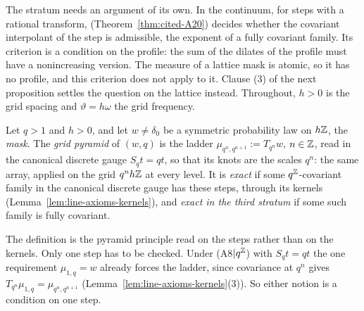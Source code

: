 The stratum needs an argument of its own. In the continuum, for steps with a rational transform,
 (Theorem~\ref{thm:cited-A20}) decides whether the covariant
interpolant of the step is admissible, the exponent of a fully covariant family. Its criterion is a
condition on the \Levy{} profile: the sum of the dilates of the profile must have a nonincreasing
version. The \Levy{} measure of a lattice mask is atomic, so it has no profile, and this criterion
does not apply to it. Clause (3) of the next proposition settles the question on the lattice
instead. Throughout, $h > 0$ is the grid spacing and $\vartheta = h\omega$ the grid frequency.

\begin{definition}
\label{def:grid-pyramid-line}

Let $q > 1$ and $h > 0$, and let $w \ne \delta_0$ be a symmetric probability law on $h\mathbb{Z}$, the
\emph{mask}. The \emph{grid pyramid} of $(w, q)$ is the ladder $\mu_{q^n,q^{n+1}} := T_{q^n}w$,
$n \in \mathbb{Z}$, read in the canonical discrete gauge $S_qt = qt$, so that its knots are the scales
$q^n$: the same array, applied on the grid $q^nh\mathbb{Z}$ at every level. It is
\emph{exact} if some $q^{\mathbb{Z}}$-covariant family in the canonical discrete gauge has these
steps, through its kernels (Lemma~\ref{lem:line-axioms-kernels}), and \emph{exact in the third stratum} if
some such family is fully covariant.
\end{definition}

The definition is the pyramid principle read on the steps rather than on the kernels. Only one step
has to be checked. Under (A8$|q^{\mathbb{Z}}$) with $S_qt = qt$ the one requirement $\mu_{1,q} = w$
already forces the ladder, since covariance at $q^n$ gives $T_{q^n}\mu_{1,q} = \mu_{q^n,q^{n+1}}$
(Lemma~\ref{lem:line-axioms-kernels}(3)). So either notion is a condition on one step.

